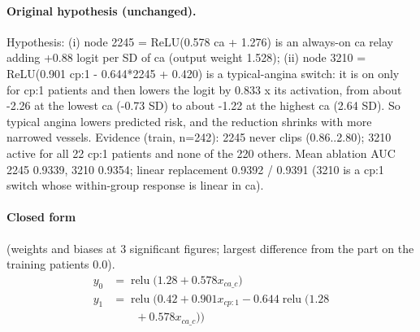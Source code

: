 \documentclass[a4paper,10pt]{article}
\newif\ifreviewmarks
\newcommand{\reviewrule}{\noindent{\color{BrickRed}\rule{\linewidth}{0.8pt}}}
\newenvironment{drafted}[1][]{%
  \ifreviewmarks\par\addvspace{\medskipamount}\reviewrule\par\nopagebreak
  \noindent{\color{BrickRed}\sffamily\footnotesize\textbf{Thesis Draft}\quad #1\hfill review}\par\nopagebreak\smallskip\fi}{%
  \ifreviewmarks\par\smallskip\noindent{\color{BrickRed}\sffamily\footnotesize end of thesis draft}\par\nopagebreak\reviewrule\par\medskip\fi}
\begin{document}
\begin{drafted}[plain-language layer: heart-s1-c1]
\paragraph{Original hypothesis (unchanged).} Hypothesis: (i) node 2245 = ReLU(0.578 ca + 1.276) is an always-on ca relay adding +0.88 logit per SD of ca (output weight 1.528); (ii) node 3210 = ReLU(0.901 cp:1 - 0.644*2245 + 0.420) is a typical-angina switch: it is on only for cp:1 patients and then lowers the logit by 0.833 x its activation, from about -2.26 at the lowest ca (-0.73 SD) to about -1.22 at the highest ca (2.64 SD). So typical angina lowers predicted risk, and the reduction shrinks with more narrowed vessels. Evidence (train, n=242): 2245 never clips (0.86..2.80); 3210 active for all 22 cp:1 patients and none of the 220 others. Mean ablation AUC 2245 0.9339, 3210 0.9354; linear replacement 0.9392 / 0.9391 (3210 is a cp:1 switch whose within-group response is linear in ca).
\paragraph{Closed form} {\footnotesize(weights and biases at 3 significant figures; largest difference from the part on the training patients 0.0).}
{\small\begingroup\allowdisplaybreaks
\begin{align*}
y_{0} &= \operatorname{relu}\bigl(1.28 + 0.578 x_{ca\_c}\bigr) \\
y_{1} &= \operatorname{relu}\bigl(0.42 + 0.901 x_{cp:1} - 0.644 \operatorname{relu}\bigl(1.28 \\
&\qquad + 0.578 x_{ca\_c}\bigr)\bigr)
\end{align*}\endgroup}


\end{drafted}
\end{document}

